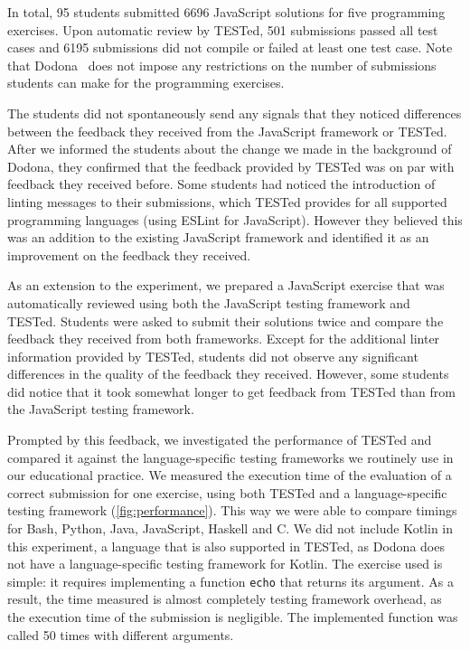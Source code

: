 \documentclass[../main]{subfiles}
\begin{document}
In total, \num{95} students submitted \num{6696} JavaScript solutions for five programming exercises.
Upon automatic review by TESTed, \num{501} submissions passed all test cases and \num{6195} submissions did not compile or failed at least one test case.
Note that Dodona~\autocite{vanpetegemDodonaLearnCode2023} does not impose any restrictions on the number of submissions students can make for the programming exercises.

The students did not spontaneously send any signals that they noticed differences between the feedback they received from the JavaScript framework or TESTed.
After we informed the students about the change we made in the background of Dodona, they confirmed that the feedback provided by TESTed was on par with feedback they received before.
Some students had noticed the introduction of linting messages to their submissions, which TESTed provides for all supported programming languages (using ESLint for JavaScript).
However they believed this was an addition to the existing JavaScript framework and identified it as an improvement on the feedback they received.

As an extension to the experiment, we prepared a JavaScript exercise that was automatically reviewed using both the JavaScript testing framework and TESTed.
Students were asked to submit their solutions twice and compare the feedback they received from both frameworks.
Except for the additional linter information provided by TESTed, students did not observe any significant differences in the quality of the feedback they received.
However, some students did notice that it took somewhat longer to get feedback from TESTed than from the JavaScript testing framework.

Prompted by this feedback, we investigated the performance of TESTed and compared it against the language-specific testing frameworks we routinely use in our educational practice.
We measured the execution time of the evaluation of a correct submission for one exercise, using both TESTed and a language-specific testing framework (\cref{fig:performance}).
This way we were able to compare timings for Bash, Python, Java, JavaScript, Haskell and C\@.
We did not include Kotlin in this experiment, a language that is also supported in TESTed, as Dodona does not have a language-specific testing framework for Kotlin.
The exercise used is simple: it requires implementing a function \texttt{echo} that returns its argument.
As a result, the time measured is almost completely testing framework overhead, as the execution time of the submission is negligible.
The implemented function was called 50 times with different arguments.
\end{document}
